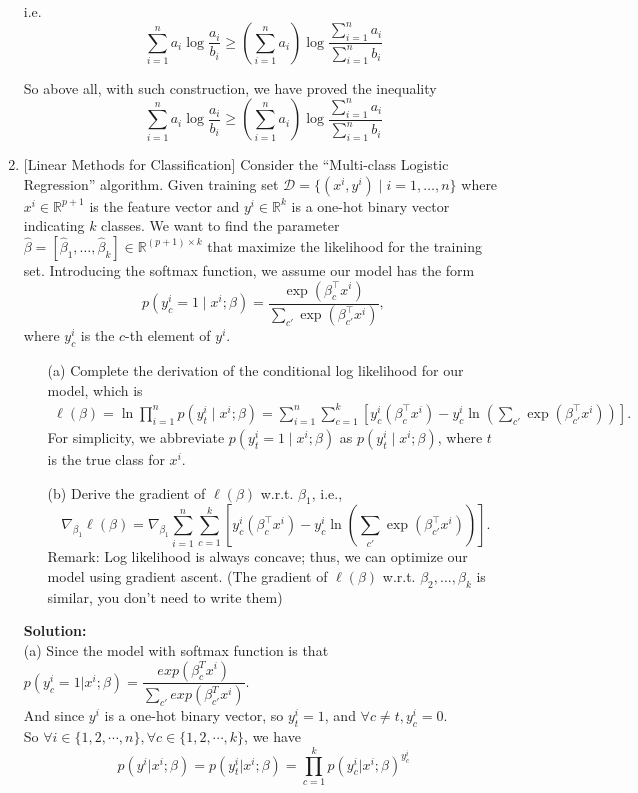 \documentclass[10pt]{article}
\begin{document}
\begin{enumerate}[1.]
		  i.e. $$\sum\limits_{i=1}^{n} a_i \log \frac{a_i}{b_i} \geq \left( \sum_{i=1}^{n} a_i\right) \log \frac{\sum_{i=1}^{n} a_i}{\sum_{i=1}^{n} b_i}$$

		  So above all, with such construction, we have proved the inequality
		  $$\sum_{i=1}^{n} a_i \log \frac{a_i}{b_i} \geq \left( \sum_{i=1}^{n} a_i\right) \log \frac{\sum_{i=1}^{n} a_i}{\sum_{i=1}^{n} b_i}$$

	      \newpage

	\item {} [Linear Methods for Classification] 
	Consider the ``Multi-class Logistic Regression'' algorithm. Given training set 
	$\mathcal{D}=\{(x^i,y^i)\mid i=1,\ldots,n\}$ where $x^i\in \mathbb{R}^{p+1}$ is the 
	feature vector and $y^i\in \mathbb{R}^{k}$ is a one-hot binary vector indicating 
	$k$ classes. We want to find the parameter $\hat{\beta}=[\hat{\beta}_1,\ldots,\hat{\beta}_k]\in \mathbb{R}^{(p+1)\times k}$ 
	that maximize the likelihood for the training set. Introducing the softmax 
	function, we assume our model has the form 
	\[
		p(y_c^i=1\mid x^i;\beta) = \frac{\exp(\beta_c^\top x^i)}{\sum_{c'}\exp(\beta_{c'}^\top x^i)},
	\]
	where $y_c^i$ is the $c$-th element of $y^i$.
		  \begin{itemize}
			\item[(a)] Complete the derivation of the conditional log likelihood for our model, which is
			\begin{align*}
				\ell(\beta) = \ln \prod_{i=1}^{n} p(y_t^i\mid x^i;\beta)
				=\sum_{i=1}^{n}\sum_{c=1}^{k}\left[ y_c^i(\beta_c^\top x^i) - y_c^i\ln \left(\sum_{c'}\exp(\beta_{c'}^\top x^i) \right)\right].
			\end{align*}
			For simplicity, we abbreviate $p(y_t^i=1\mid x^i;\beta)$ as $p(y_t^i\mid x^i;\beta)$, where 
			$t$ is the true class for $x^i$.~
			\item[(b)] Derive the gradient of $\ell(\beta)$ w.r.t. $\beta_1$, i.e., 
			\[
				\nabla_{\beta_1}\ell(\beta) = \nabla_{\beta_1} \sum_{i=1}^{n}\sum_{c=1}^{k}\left[ y_c^i(\beta_c^\top x^i) - y_c^i\ln \left(\sum_{c'}\exp(\beta_{c'}^\top x^i) \right)\right].
			\]
			Remark: Log likelihood is always concave; thus, we can optimize our model 
			using gradient ascent. (The gradient of $\ell(\beta)$ w.r.t. $\beta_2,\ldots,\beta_k$ is similar, you don't need to write them)~
		  \end{itemize}
		  \textbf{Solution:}\\
		  (a) Since the model with softmax function is that $p(y_c^i=1|x^i;\beta)=\dfrac{exp(\beta_c^Tx^i)}{\sum\limits_{c'}exp(\beta_{c'}^Tx^i)}$.\\
		  And since $y^i$ is a one-hot binary vector, so $y_t^i=1$, and $\forall c\neq t, y_{c}^i=0$.\\
		  So $\forall i\in\{1,2,\cdots,n\},\forall c\in\{1,2,\cdots,k\}$, we have
		  $$p(y^i|x^i;\beta)=p(y_t^i|x^i;\beta)=\prod\limits_{c=1}^k p(y_{c}^i|x^i;\beta)^{y_{c}^i}$$
		  

\end{enumerate}
\end{document}
